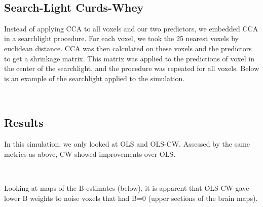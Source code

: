 \documentclass{article}
\begin{document}
        
    \begin{center}
    \end{center}
    { \hspace*{\fill} \\}
    
    \subsection{Search-Light Curds-Whey}\label{search-light-curds-whey}

Instead of applying CCA to all voxels and our two predictors, we
embedded CCA in a searchlight procedure. For each voxel, we took the 25
nearest voxels by euclidean distance. CCA was then calculated on these
voxels and the predictors to get a shrinkage matrix. This matrix was
applied to the predictions of voxel in the center of the searchlight,
and the procedure was repeated for all voxels. Below is an example of
the searchlight applied to the simulation.


    \begin{center}
    \end{center}
    { \hspace*{\fill} \\}
    
    \subsection{Results}\label{results}

In this simulation, we only looked at OLS and OLS-CW. Assessed by the
same metrics as above, CW showed improvements over OLS.



    \begin{center}
    \end{center}
    { \hspace*{\fill} \\}
    
    Looking at maps of the B estimates (below), it is apparent that OLS-CW
gave lower B weights to noise voxels that had B=0 (upper sections
of the brain maps).


    \begin{center}
    \end{center}
    { \hspace*{\fill} \\}
    
\end{document}
